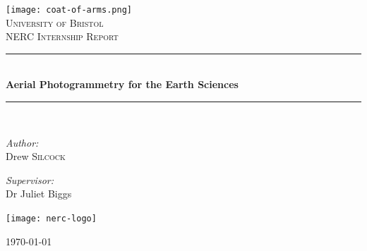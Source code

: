 \begin{titlepage}
\begin{center}

\newcommand{\HRule}{\rule{\linewidth}{0.5mm}}

\texttt{[image: coat-of-arms.png]}~\\[1cm]

\textsc{\LARGE University of Bristol}\\[1.5cm]


\textsc{\Large NERC Internship Report}\\[0.5cm]

\HRule \\[0.4cm]
{ \huge \bfseries Aerial Photogrammetry for the Earth Sciences}\\[0.4cm]

\HRule \\[1.5cm]

\begin{minipage}{0.4\textwidth}
\begin{flushleft} \large
\emph{Author:}\\
Drew \textsc{Silcock}
\end{flushleft}
\end{minipage}
\begin{minipage}{0.4\textwidth}
\begin{flushright} \large
\emph{Supervisor:} \\
Dr Juliet Biggs
\end{flushright}
\end{minipage}

\vspace{10mm}

\texttt{[image: nerc-logo]}~\\[1cm]

\vfill

{\large \longdate \today}

\end{center}
\end{titlepage}
